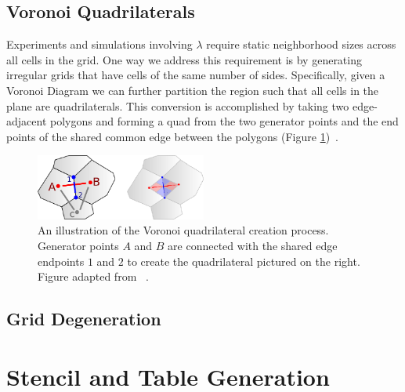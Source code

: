 \documentclass[a4paper,11pt]{report}
\begin{document}
\subsection{Voronoi Quadrilaterals}

Experiments and simulations involving $\lambda$ require static neighborhood sizes across all cells in the grid. One way we address this requirement is by generating irregular grids that have cells of the same number of sides. Specifically, given a Voronoi Diagram we can further partition the region such that all cells in the plane are quadrilaterals. This conversion is accomplished by taking two edge-adjacent polygons and forming a quad from the two generator points and the end points of the shared common edge between the polygons (Figure \ref{fig:vquad_gen})~\cite{am10}.

\begin{figure}[htp]
\centering
\includegraphics[width=0.5\textwidth]{vquad_generation}
\caption[Voronoi Quad Generation]{
	An illustration of the Voronoi quadrilateral creation process. Generator points $A$ and $B$ are connected with the shared edge endpoints $1$ and $2$ to create the quadrilateral pictured on the right. Figure adapted from \citeauthor{am10}~\cite{am10}. 
}
\label{fig:vquad_gen}
\end{figure}

\subsection{Grid Degeneration}

\section{Stencil and Table Generation}
\label{sec:StencilGen}

\processdelayedfloats
\end{document}
